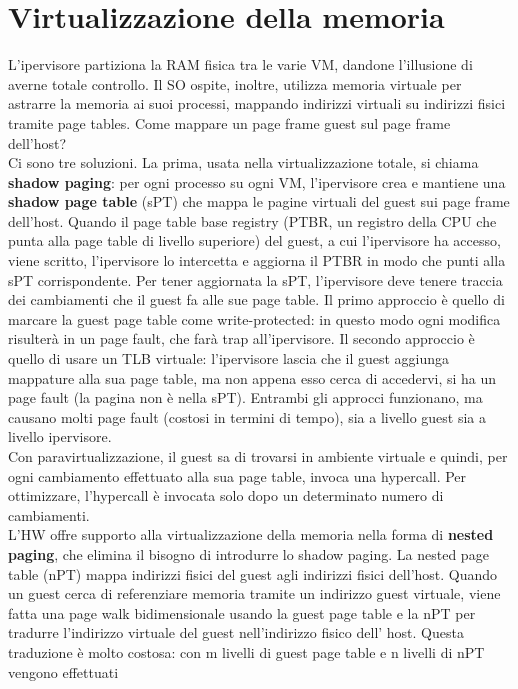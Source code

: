 \documentclass[12pt]{article}
\begin{document}
\section{Virtualizzazione della memoria}
L'ipervisore partiziona la RAM fisica tra le varie VM, dandone l'illusione di averne totale controllo. Il SO ospite, 
inoltre, utilizza memoria virtuale per astrarre la memoria ai suoi processi, mappando indirizzi virtuali su indirizzi
fisici tramite page tables. Come mappare un page frame guest sul page frame dell'host?\\
Ci sono tre soluzioni. La prima, usata nella virtualizzazione totale, si chiama \textbf{shadow paging}: per ogni processo
su ogni VM, l'ipervisore crea e mantiene una \textbf{shadow page table} (sPT) che mappa le pagine virtuali del guest sui
page frame dell'host. Quando il page table base registry (PTBR, un registro della CPU che punta alla page table di
livello superiore) del guest, a cui l'ipervisore ha accesso, viene scritto, l'ipervisore lo intercetta e aggiorna il PTBR
in modo che punti alla sPT corrispondente. Per tener aggiornata la sPT, l'ipervisore deve tenere traccia dei cambiamenti
che il guest fa alle sue page table. Il primo approccio è quello di marcare la guest page table come write-protected: in
questo modo ogni modifica risulterà in un page fault, che farà trap all'ipervisore. Il secondo approccio è quello di 
usare un TLB virtuale: l'ipervisore lascia che il guest aggiunga mappature alla sua page table, ma non appena esso cerca
di accedervi, si ha un page fault (la pagina non è nella sPT).
Entrambi gli approcci funzionano, ma causano molti page fault (costosi in termini di tempo), sia a livello guest sia a 
livello ipervisore.\\
Con paravirtualizzazione, il guest sa di trovarsi in ambiente virtuale e quindi, per ogni cambiamento effettuato alla
sua page table, invoca una hypercall. Per ottimizzare, l'hypercall è invocata solo dopo un determinato numero di
cambiamenti.\\
L'HW offre supporto alla virtualizzazione della memoria nella forma di \textbf{nested paging}, che elimina il bisogno di
introdurre lo shadow paging. La nested page table (nPT) mappa indirizzi fisici del guest agli indirizzi fisici dell'host.
Quando un guest cerca di referenziare memoria tramite un indirizzo guest virtuale, viene fatta una page walk
bidimensionale usando la guest page table e la nPT per tradurre l'indirizzo virtuale del guest nell'indirizzo fisico dell'
host. Questa traduzione è molto costosa: con m livelli di guest page table e n livelli di nPT vengono effettuati
\end{document}
